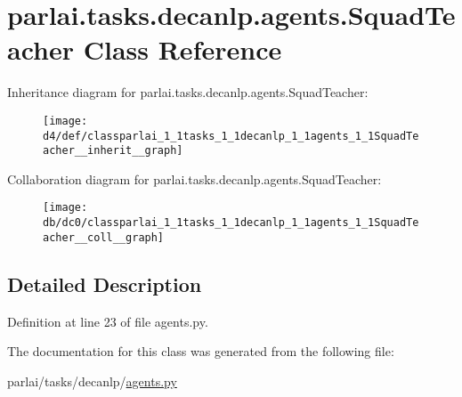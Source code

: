\hypertarget{classparlai_1_1tasks_1_1decanlp_1_1agents_1_1SquadTeacher}{}\section{parlai.\+tasks.\+decanlp.\+agents.\+Squad\+Teacher Class Reference}
\label{classparlai_1_1tasks_1_1decanlp_1_1agents_1_1SquadTeacher}


Inheritance diagram for parlai.\+tasks.\+decanlp.\+agents.\+Squad\+Teacher\+:\nopagebreak
\begin{figure}[H]
\begin{center}
\leavevmode
\texttt{[image: d4/def/classparlai\_1\_1tasks\_1\_1decanlp\_1\_1agents\_1\_1SquadTeacher\_\_inherit\_\_graph]}
\end{center}
\end{figure}


Collaboration diagram for parlai.\+tasks.\+decanlp.\+agents.\+Squad\+Teacher\+:\nopagebreak
\begin{figure}[H]
\begin{center}
\leavevmode
\texttt{[image: db/dc0/classparlai\_1\_1tasks\_1\_1decanlp\_1\_1agents\_1\_1SquadTeacher\_\_coll\_\_graph]}
\end{center}
\end{figure}


\subsection{Detailed Description}


Definition at line 23 of file agents.\+py.



The documentation for this class was generated from the following file\+:\begin{DoxyCompactItemize}
\item 
parlai/tasks/decanlp/\hyperlink{parlai_2tasks_2decanlp_2agents_8py}{agents.\+py}\end{DoxyCompactItemize}
